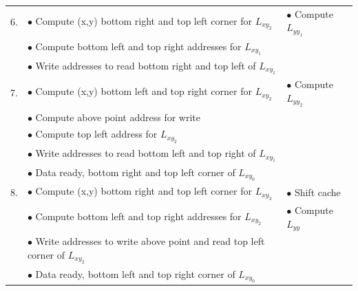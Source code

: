 \documentclass[sigconf]{acmart/acmart}
\begin{document}
\begin{table}[h]
\begin{tabulary}{1.0\textwidth}{L|L|L}
		6. & $\bullet$ Compute (x,y) bottom right and top left corner for $L_{xy_2}$ & $\bullet$ Compute $L_{yy_1}$ \\
		& $\bullet$ Compute bottom left and top right addresses for $L_{xy_1}$ & \\
		& $\bullet$ Write addresses to read bottom right and top left of $L_{xy_1}$ & \\
		\hline 
		
		7. & $\bullet$ Compute (x,y) bottom left and top right corner for $L_{xy_2}$ & $\bullet$ Compute $L_{yy_2}$ \\
		& $\bullet$ Compute above point address for write & \\
		& $\bullet$ Compute top left address for $L_{xy_2}$ & \\
		& $\bullet$ Write addresses to read bottom left and top right of $L_{xy_1}$ & \\
		& $\bullet$ Data ready, bottom right and top left corner of $L_{xy_0}$ & \\
		\hline
		
		8. & $\bullet$ Compute (x,y) bottom right and top left corner for $L_{xy_3}$ & $\bullet$ Shift cache \\
		& $\bullet$ Compute bottom left and top right addresses for $L_{xy_2}$ & $\bullet$ Compute $L_{yy}$ \\
		& $\bullet$ Write addresses to write above point and read top left corner of $L_{xy_2}$ & \\
		& $\bullet$ Data ready, bottom left and top right corner of $L_{xy_0}$ & \\
		\hline
	\end{tabulary}
\end{table}
\end{document}
